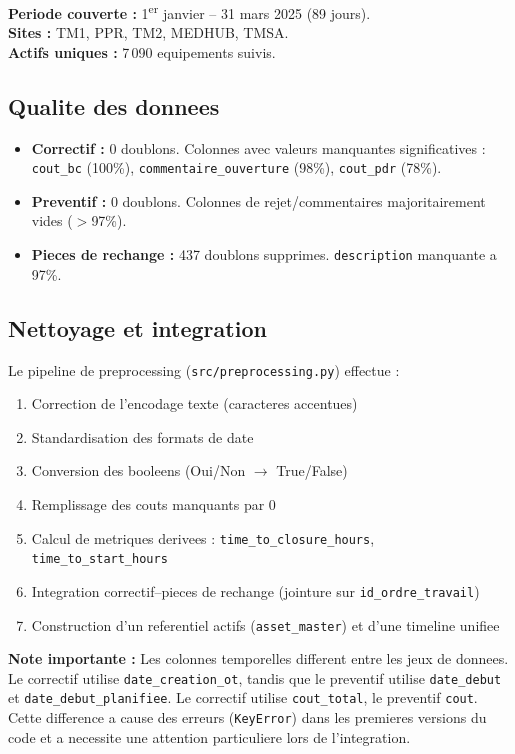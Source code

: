 \documentclass[12pt,a4paper]{article}
\begin{document}
\textbf{Periode couverte :} 1\textsuperscript{er} janvier -- 31 mars 2025 (89 jours). \\
\textbf{Sites :} TM1, PPR, TM2, MEDHUB, TMSA. \\
\textbf{Actifs uniques :} 7\,090 equipements suivis.

\subsection{Qualite des donnees}

\begin{itemize}
  \item \textbf{Correctif :} 0 doublons. Colonnes avec valeurs manquantes significatives : \texttt{cout\_bc} (100\%), \texttt{commentaire\_ouverture} (98\%), \texttt{cout\_pdr} (78\%).
  \item \textbf{Preventif :} 0 doublons. Colonnes de rejet/commentaires majoritairement vides ($>$97\%).
  \item \textbf{Pieces de rechange :} 437 doublons supprimes. \texttt{description} manquante a 97\%.
\end{itemize}

\subsection{Nettoyage et integration}

Le pipeline de preprocessing (\texttt{src/preprocessing.py}) effectue :

\begin{enumerate}
  \item Correction de l'encodage texte (caracteres accentues)
  \item Standardisation des formats de date
  \item Conversion des booleens (Oui/Non $\rightarrow$ True/False)
  \item Remplissage des couts manquants par 0
  \item Calcul de metriques derivees : \texttt{time\_to\_closure\_hours}, \texttt{time\_to\_start\_hours}
  \item Integration correctif--pieces de rechange (jointure sur \texttt{id\_ordre\_travail})
  \item Construction d'un referentiel actifs (\texttt{asset\_master}) et d'une timeline unifiee
\end{enumerate}

\textbf{Note importante :} Les colonnes temporelles different entre les jeux de donnees. Le correctif utilise \texttt{date\_creation\_ot}, tandis que le preventif utilise \texttt{date\_debut} et \texttt{date\_debut\_planifiee}. Le correctif utilise \texttt{cout\_total}, le preventif \texttt{cout}. Cette difference a cause des erreurs (\texttt{KeyError}) dans les premieres versions du code et a necessite une attention particuliere lors de l'integration.
\end{document}
